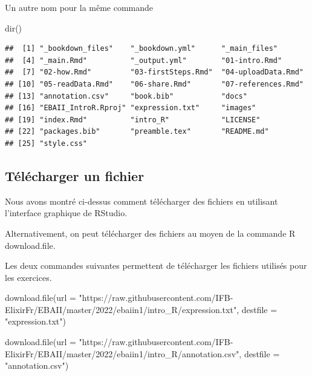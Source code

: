 \documentclass[
]{book}
\newenvironment{Shaded}{\begin{snugshade}}{\end{snugshade}}
\newcommand{\AttributeTok}[1]{\textcolor[rgb]{0.77,0.63,0.00}{#1}}
\newcommand{\FunctionTok}[1]{\textcolor[rgb]{0.00,0.00,0.00}{#1}}
\newcommand{\NormalTok}[1]{#1}
\newcommand{\StringTok}[1]{\textcolor[rgb]{0.31,0.60,0.02}{#1}}
\begin{document}
Un autre nom pour la même commande

\begin{Shaded}
\begin{Highlighting}[]
\FunctionTok{dir}\NormalTok{()}
\end{Highlighting}
\end{Shaded}

\begin{verbatim}
##  [1] "_bookdown_files"    "_bookdown.yml"      "_main_files"       
##  [4] "_main.Rmd"          "_output.yml"        "01-intro.Rmd"      
##  [7] "02-how.Rmd"         "03-firstSteps.Rmd"  "04-uploadData.Rmd" 
## [10] "05-readData.Rmd"    "06-share.Rmd"       "07-references.Rmd" 
## [13] "annotation.csv"     "book.bib"           "docs"              
## [16] "EBAII_IntroR.Rproj" "expression.txt"     "images"            
## [19] "index.Rmd"          "intro_R"            "LICENSE"           
## [22] "packages.bib"       "preamble.tex"       "README.md"         
## [25] "style.css"
\end{verbatim}

\hypertarget{tuxe9luxe9charger-un-fichier}{%
\subsection{Télécharger un fichier}\label{tuxe9luxe9charger-un-fichier}}

Nous avons montré ci-dessus comment télécharger des fichiers en utilisant l'interface graphique de RStudio.

Alternativement, on peut télécharger des fichiers au moyen de la commande R download.file.

Les deux commandes suivantes permettent de télécharger les fichiers utilisés pour les exercices.

\begin{Shaded}
\begin{Highlighting}[]
\FunctionTok{download.file}\NormalTok{(}\AttributeTok{url =} \StringTok{"https://raw.githubusercontent.com/IFB{-}ElixirFr/EBAII/master/2022/ebaiin1/intro\_R/expression.txt"}\NormalTok{, }\AttributeTok{destfile =} \StringTok{"expression.txt"}\NormalTok{)}
\end{Highlighting}
\end{Shaded}

\begin{Shaded}
\begin{Highlighting}[]
\FunctionTok{download.file}\NormalTok{(}\AttributeTok{url =} \StringTok{"https://raw.githubusercontent.com/IFB{-}ElixirFr/EBAII/master/2022/ebaiin1/intro\_R/annotation.csv"}\NormalTok{, }\AttributeTok{destfile =} \StringTok{"annotation.csv"}\NormalTok{)}
\end{Highlighting}
\end{Shaded}
\end{document}
